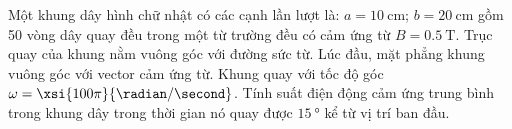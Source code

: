 \begin{ex}
	Một khung dây hình chữ nhật có các cạnh lần lượt là: $a=\SI{10}{\centi\meter}$; $b=\SI{20}{\centi\meter}$ gồm 50 vòng dây quay đều trong một từ trường đều có cảm ứng từ $B=\SI{0.5}{\tesla}$. Trục quay của khung nằm vuông góc với đường sức từ. Lúc đầu, mặt phẳng khung vuông góc với vector cảm ứng từ. Khung quay với tốc độ góc $\omega=\xsi{100\pi}{\radian/\second}$. Tính suất điện động cảm ứng trung bình trong khung dây trong thời gian nó quay được $\SI{15}{\degree}$ kể từ vị trí ban đầu.
\end{ex}

